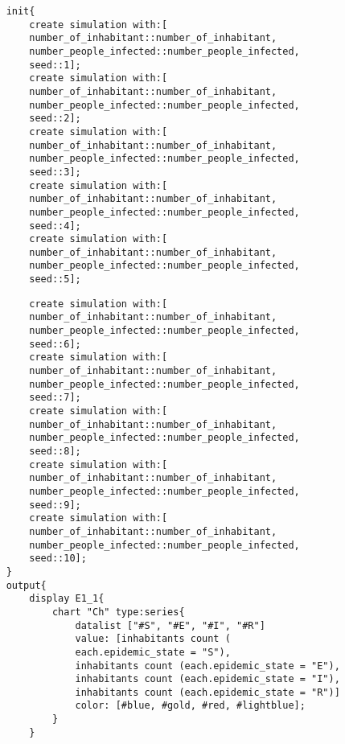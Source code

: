 \documentclass{article}
\begin{document}
\begin{pic15}
\begin{pic15}
\begin{tcolorbox}
\begin{lstlisting}
	init{
		create simulation with:[
		number_of_inhabitant::number_of_inhabitant,
		number_people_infected::number_people_infected,
		seed::1];
		create simulation with:[
		number_of_inhabitant::number_of_inhabitant,
		number_people_infected::number_people_infected,
		seed::2];
		create simulation with:[
		number_of_inhabitant::number_of_inhabitant,
		number_people_infected::number_people_infected,
		seed::3];
		create simulation with:[
		number_of_inhabitant::number_of_inhabitant,
		number_people_infected::number_people_infected,
		seed::4];
		create simulation with:[
		number_of_inhabitant::number_of_inhabitant,
		number_people_infected::number_people_infected,
		seed::5];
\end{lstlisting}
\end{tcolorbox}
\begin{tcolorbox}
\begin{lstlisting}
		create simulation with:[
		number_of_inhabitant::number_of_inhabitant,
		number_people_infected::number_people_infected,
		seed::6];
		create simulation with:[
		number_of_inhabitant::number_of_inhabitant,
		number_people_infected::number_people_infected,
		seed::7];
		create simulation with:[
		number_of_inhabitant::number_of_inhabitant,
		number_people_infected::number_people_infected,
		seed::8];
		create simulation with:[
		number_of_inhabitant::number_of_inhabitant,
		number_people_infected::number_people_infected,
		seed::9];
		create simulation with:[
		number_of_inhabitant::number_of_inhabitant,
		number_people_infected::number_people_infected,
		seed::10];
	}
	output{
		display E1_1{
			chart "Ch" type:series{
				datalist ["#S", "#E", "#I", "#R"] 
				value: [inhabitants count (
				each.epidemic_state = "S"), 
				inhabitants count (each.epidemic_state = "E"), 
				inhabitants count (each.epidemic_state = "I"), 
				inhabitants count (each.epidemic_state = "R")] 
				color: [#blue, #gold, #red, #lightblue];
			}
		}
		

\end{lstlisting}
\end{tcolorbox}
\end{pic15}
\end{pic15}
\end{document}
